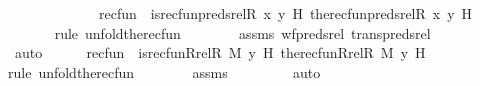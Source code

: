 \begin{isabellebody}
\ \ \ \ \isamarkupfalse%
\isanewline
\ \ \isanewline
\ \ \ \ \isamarkupfalse%
\ recfun\ {\isacharcolon}{\kern0pt}\ {\isachardoublequoteopen}is{\isacharunderscore}{\kern0pt}recfun{\isacharparenleft}{\kern0pt}preds{\isacharunderscore}{\kern0pt}rel{\isacharparenleft}{\kern0pt}R{\isacharcomma}{\kern0pt}\ x{\isacharparenright}{\kern0pt}{\isacharcomma}{\kern0pt}\ y{\isacharcomma}{\kern0pt}\ H{\isacharcomma}{\kern0pt}\ the{\isacharunderscore}{\kern0pt}recfun{\isacharparenleft}{\kern0pt}preds{\isacharunderscore}{\kern0pt}rel{\isacharparenleft}{\kern0pt}R{\isacharcomma}{\kern0pt}\ x{\isacharparenright}{\kern0pt}{\isacharcomma}{\kern0pt}\ y{\isacharcomma}{\kern0pt}\ H{\isacharparenright}{\kern0pt}{\isacharparenright}{\kern0pt}{\isachardoublequoteclose}\ \isanewline
\ \ \ \ \ \ \isamarkupfalse%
{\isacharparenleft}{\kern0pt}rule\ unfold{\isacharunderscore}{\kern0pt}the{\isacharunderscore}{\kern0pt}recfun{\isacharparenright}{\kern0pt}\isanewline
\ \ \ \ \ \ \isamarkupfalse%
\ assms\ wf{\isacharunderscore}{\kern0pt}preds{\isacharunderscore}{\kern0pt}rel\ trans{\isacharunderscore}{\kern0pt}preds{\isacharunderscore}{\kern0pt}rel\ \isanewline
\ \ \ \ \ \ \isamarkupfalse%
\ auto\isanewline
\ \ \ \ \isamarkupfalse%
\ recfun{\isacharprime}{\kern0pt}\ {\isacharcolon}{\kern0pt}\ {\isachardoublequoteopen}is{\isacharunderscore}{\kern0pt}recfun{\isacharparenleft}{\kern0pt}Rrel{\isacharparenleft}{\kern0pt}R{\isacharcomma}{\kern0pt}\ M{\isacharparenright}{\kern0pt}{\isacharcomma}{\kern0pt}\ y{\isacharcomma}{\kern0pt}\ H{\isacharcomma}{\kern0pt}\ the{\isacharunderscore}{\kern0pt}recfun{\isacharparenleft}{\kern0pt}Rrel{\isacharparenleft}{\kern0pt}R{\isacharcomma}{\kern0pt}\ M{\isacharparenright}{\kern0pt}{\isacharcomma}{\kern0pt}\ y{\isacharcomma}{\kern0pt}\ H{\isacharparenright}{\kern0pt}{\isacharparenright}{\kern0pt}{\isachardoublequoteclose}\ \isanewline
\ \ \ \ \ \ \isamarkupfalse%
{\isacharparenleft}{\kern0pt}rule\ unfold{\isacharunderscore}{\kern0pt}the{\isacharunderscore}{\kern0pt}recfun{\isacharparenright}{\kern0pt}\isanewline
\ \ \ \ \ \ \isamarkupfalse%
\ assms\ \isanewline
\ \ \ \ \ \ \isamarkupfalse%
\ auto\isanewline
\isanewline
\ \ \ \ \isamarkupfalse%

\end{isabellebody}
